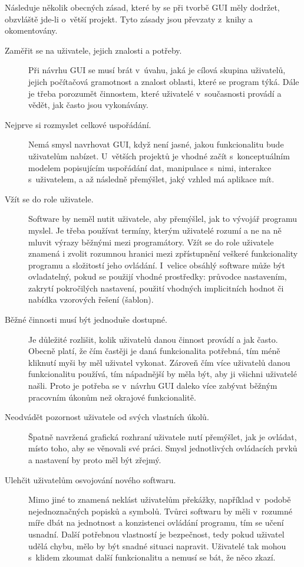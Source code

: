 \documentclass[a4paper,12pt,draft]{article}
\begin{document}
Následuje několik obecných zásad, které by se při tvorbě GUI měly
dodržet, obzvláště jde-li o~větší projekt. Tyto zásady jsou převzaty
z~knihy \cite{bloopers} a okomentovány.
\begin{description}
    \item[Zaměřit se na uživatele, jejich znalosti a
    potřeby.] Při návrhu GUI se musí brát v~úvahu, jaká je cílová
    skupina uživatelů, jejich počítačová gramotnost a znalost oblasti,
    které se program týká. Dále je třeba porozumět činnostem,
    které uživatelé v~současnosti provádí a vědět, jak často jsou
    vykonávány.

\item [Nejprve si rozmyslet celkové uspořádání.]
Nemá smysl  navrhovat GUI, když není jasné, jakou funkcionalitu
bude uživatelům nabízet. U~větších projektů je vhodné začít
s~konceptuálním modelem popisujícím uspořádání dat, manipulace s~nimi,
interakce s~uživatelem, a až následně přemýšlet, jaký vzhled má
aplikace mít.

\item [Vžít se do role uživatele.] Software by neměl nutit uživatele,
aby přemýšlel, jak to vývojář programu myslel. Je třeba používat
termíny, kterým uživatelé rozumí a ne na ně mluvit výrazy běžnými
mezi programátory. Vžít se do role uživatele znamená i zvolit rozumnou
hranici mezi zpřístupnění veškeré funkcionality programu a složitostí
jeho ovládání. I~velice obsáhlý software může být ovladatelný,
pokud se použijí vhodné prostředky: průvodce nastavením, zakrytí
pokročilých nastavení, použití vhodných implicitních hodnot či
nabídka vzorových řešení (šablon).

\item [Běžné činnosti musí být jednoduše dostupné.]  Je důležité rozlišit,
 kolik uži\-vatelů danou činnost provádí a jak často. Obecně
platí, že čím častěji je daná funkcionalita potřebná, tím méně
kliknutí myši by měl uživatel vykonat. Zároveň čím více uživatelů
danou funkcionalitu používá, tím nápadnější  by měla být, aby
ji všichni uživatelé našli. Proto je potřeba se v~návrhu GUI  daleko
více zabývat běžným pracovním úkonům než okrajové funkcionalitě.

\item [Neodvádět pozornost uživatele od svých vlastních úkolů.] Špatně
navržená grafická rozhraní uživatele nutí přemýšlet, jak je ovládat,
místo toho, aby se věnovali své práci. Smysl jednotlivých ovládacích
prvků a nastavení by proto měl být zřejmý.

\item [Ulehčit uživatelům osvojování nového softwaru.] Mimo jiné to znamená
ne\-klást uživatelům překážky, například v~podobě nejednoznačných popisků
a symbolů. Tvůrci softwaru by měli v~rozumné míře dbát na jednotnost
a konzistenci ovládání programu, tím se učení usnadní. Další
potřebnou vlastností je bezpečnost, tedy pokud uživatel udělá chybu,
mělo by být snadné situaci napravit. Uživatelé tak mohou s~klidem
zkoumat další funkcionalitu a nemusí se bát, že něco zkazí.


\end{description}
\end{document}
